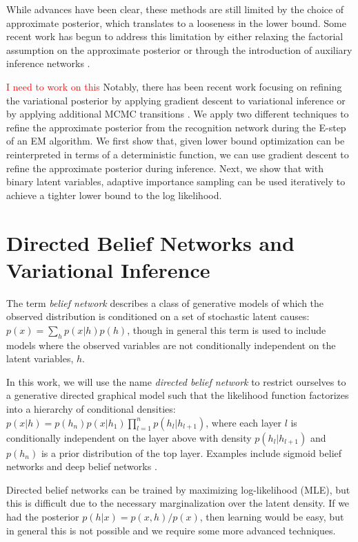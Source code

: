 \documentclass{article} %
\newcommand{\alert}[1]{\textcolor{red}{#1}}
\begin{document}
While advances have been clear, these methods are still limited by the choice
of approximate posterior, which translates to a looseness in the lower bound.
Some recent work has begun to address this limitation by either relaxing the
factorial assumption \citep{burda2015importance} on the approximate posterior or
through the introduction of auxiliary inference networks
\citep{rezende2015variational}. 

\alert{I need to work on this} Notably, there has been recent work focusing on
refining the variational posterior by applying gradient descent to variational
inference \citep{hoffman2013stochastic} or by applying additional MCMC
transitions \citep{salimans2014markov}. We apply two different techniques to
refine the approximate posterior from the recognition network during the E-step
of an EM algorithm. We first show that, given lower bound optimization can be
reinterpreted in terms of a deterministic function, we can use gradient descent
to refine the approximate posterior during inference. Next, we show that with
binary latent variables, adaptive importance sampling
\citep[AdIS][]{karamchandani1989adaptive} can be used iteratively to achieve a tighter
lower bound to the log likelihood.

\section{Directed Belief Networks and Variational Inference}

The term \emph{belief network} describes a class of generative models of which
the observed distribution is conditioned on a set of stochastic latent causes:
$p(x) = \sum_h p(x|h) p(h)$, though in general this term is used to include
models where the observed variables are not conditionally independent on the
latent variables, $h$. 

In this work, we will use the name \emph{directed belief network} to restrict
ourselves to a generative directed graphical model such that the likelihood
function factorizes into a hierarchy of conditional densities: $p(x | h) =
p(h_n) p(x|h_1) \prod_{l=1}^n p(h_{l}|h_{l+1})$, where each layer $l$ is
conditionally independent on the layer above with density $p(h_{l}|h_{l + 1})$
and $p(h_n)$ is a prior distribution of the top layer. Examples include sigmoid
belief networks \citep[SBN,][]{neal1992connectionist} and deep belief networks
\citep[DBN,][]{hinton2006fast}.

Directed belief networks can be trained by maximizing log-likelihood (MLE), but
this is difficult due to the necessary marginalization over the latent density.
If we had the posterior $p(h|x) = p(x, h) / p(x)$, then learning would be easy,
but in general this is not possible and we require some more advanced
techniques. 
\end{document}
